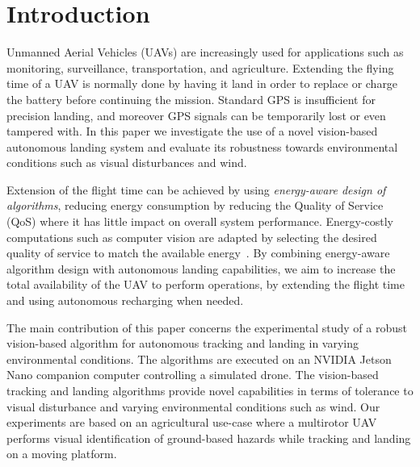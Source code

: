 \documentclass[conference]{IEEEtran}
\begin{document}
\section{Introduction}
\label{sec:introduction}

Unmanned Aerial Vehicles (UAVs) are increasingly used for applications
such as monitoring, surveillance, transportation,
and agriculture. %
%
Extending the flying time of a UAV is normally done by having it land
in order to replace or charge the battery before continuing the
mission. 
%
Standard GPS is insufficient for precision landing, and moreover
GPS signals can be temporarily lost or even tampered with. 
In this paper we investigate the use of a novel
vision-based autonomous landing system and evaluate its robustness
towards environmental conditions such as visual disturbances and wind.

Extension of the flight time can be achieved by using
\emph{energy-aware design of algorithms}, reducing energy consumption
by reducing the Quality of Service (QoS) where it has little impact on overall system performance. 
Energy-costly computations such as computer vision are adapted by
selecting the desired quality of service to match the available
energy~\cite{seewald2020mechanical}. By combining energy-aware algorithm design with autonomous landing
capabilities, we aim to increase the total availability of the UAV to
perform operations, by extending the flight time and using autonomous
recharging when needed.


The main contribution of this paper concerns the experimental study of
a robust vision-based algorithm for autonomous
tracking and landing in varying environmental conditions. The
algorithms are executed on an NVIDIA Jetson Nano companion computer
controlling a simulated drone. The vision-based tracking and landing
algorithms provide novel capabilities in terms of tolerance to visual
disturbance and varying environmental conditions such as wind.
%
Our experiments are based on an agricultural use-case where a
multirotor UAV performs visual identification of ground-based hazards
while tracking and landing on a moving platform.
%
\end{document}
